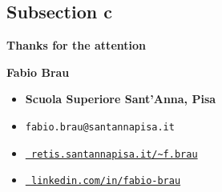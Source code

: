\documentclass[aspectratio=169, 10pt]{beamer}
\theoremstyle{definition}
\begin{document}
\subsection{Subsection c}
{%
\begin{frame}{}
  \textbf{\Huge Thanks for the attention}\\
  \vspace{20pt}
  \begin{minipage}[h]{0.6\textwidth}
  {\large\bf Fabio Brau}
  \vspace{5pt}
  \begin{itemize}
    \item[\faUniversity] {\bf Scuola Superiore Sant'Anna, Pisa}
    \item[\Letter] \texttt{fabio.brau@santannapisa.it}
    \item[\faGlobe] \href{http://retis.santannapisa.it/~f.brau/}{\tt %
                    retis.santannapisa.it/\textasciitilde f.brau}
    \item[\faLinkedin]
      \href{https://www.linkedin.com/in/fabio-brau}{\tt%
        linkedin.com/in/fabio-brau}
  \end{itemize}
  \end{minipage}
\end{frame}
}
\end{document}
